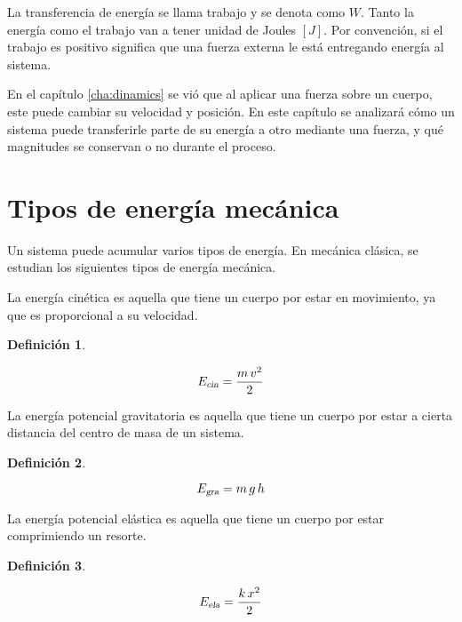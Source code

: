 \documentclass[a5paper,12pt,twoside]{book}
\newtheorem{defn}{{Definición}}[chapter]
\begin{document}
La transferencia de energía se llama trabajo y se denota como $W$. Tanto la energía como el trabajo van a tener unidad de Joules $[J]$. Por convención, si el trabajo es positivo significa que una fuerza externa le está entregando energía al sistema.

En el capítulo \ref{cha:dinamics} se vió que al aplicar una fuerza sobre un cuerpo, este puede cambiar su velocidad y posición. En este capítulo se analizará cómo un sistema puede transferirle parte de su energía a otro mediante una fuerza, y qué magnitudes se conservan o no durante el proceso.


\section{Tipos de energía mecánica}

Un sistema puede acumular varios tipos de energía. En mecánica clásica, se estudian los siguientes tipos de energía mecánica.

La energía cinética es aquella que tiene un cuerpo por estar en movimiento, ya que es proporcional a su velocidad.

\begin{mdframed}[style=MyFrame1]
    \begin{defn}
    \end{defn}
    \begin{equation*}
        {{E}_\textsl{{cin}}} = \frac{m \, v^2}{2}
    \end{equation*}
\end{mdframed}

La energía potencial gravitatoria es aquella que tiene un cuerpo por estar a cierta distancia del centro de masa de un sistema.

\begin{mdframed}[style=MyFrame1]
    \begin{defn}
    \end{defn}
    \begin{equation*}
        {{E}_\textsl{{gra}}} = m \, g \, h
    \end{equation*}
\end{mdframed}

La energía potencial elástica es aquella que tiene un cuerpo por estar comprimiendo un resorte.

\begin{mdframed}[style=MyFrame1]
    \begin{defn}
    \end{defn}
    \begin{equation*}
        {{E}_\textsl{{ela}}} = \frac{k \, x^2}{2}
    \end{equation*}
\end{mdframed}
\end{document}
